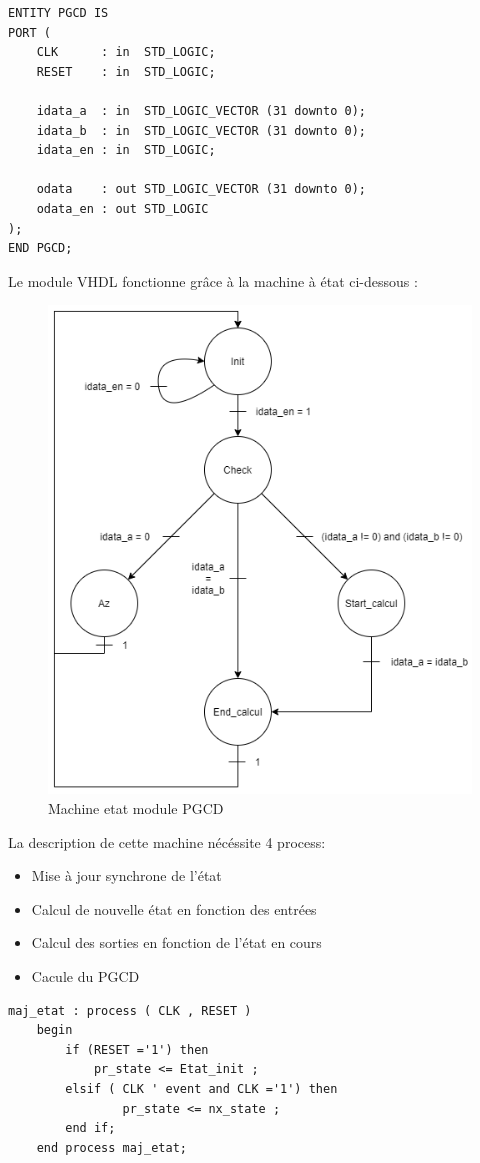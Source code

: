 \documentclass[a4paper]{article}
\begin{document}
\begin{lstlisting}[style=VHDL]
ENTITY PGCD IS
PORT ( 
    CLK      : in  STD_LOGIC;
    RESET    : in  STD_LOGIC;

    idata_a  : in  STD_LOGIC_VECTOR (31 downto 0);
    idata_b  : in  STD_LOGIC_VECTOR (31 downto 0);
    idata_en : in  STD_LOGIC;

    odata    : out STD_LOGIC_VECTOR (31 downto 0);
    odata_en : out STD_LOGIC
);
END PGCD;  
\end{lstlisting}
        Le module VHDL fonctionne grâce à la machine à état ci-dessous :
\begin{figure}[H]
    \centering
    \includegraphics[scale=0.5]{Pictures/FSM_PGCD.png}
    \caption{Machine etat module PGCD}
    \label{fig:FSM_PGCD}
\end{figure}
        La description de cette machine nécéssite 4 process:
        \begin{itemize}
            \item Mise à jour synchrone de l'état
            \item Calcul de nouvelle état en fonction des entrées
            \item Calcul des sorties en fonction de l'état en cours
            \item Cacule du PGCD
        \end{itemize}
\begin{lstlisting}[style=VHDL]
    maj_etat : process ( CLK , RESET )
    begin
        if (RESET ='1') then
            pr_state <= Etat_init ;
        elsif ( CLK ' event and CLK ='1') then
            	pr_state <= nx_state ;
        end if;
    end process maj_etat;
\end{lstlisting}
\end{document}
